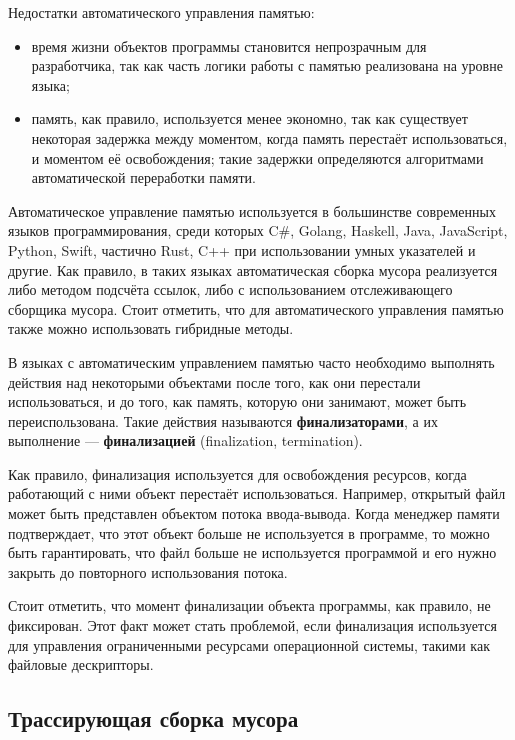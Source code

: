 Недостатки автоматического управления памятью: 

\begin{itemize}[label*=---]
	\item время жизни объектов программы становится непрозрачным для разработчика, так как часть логики работы с памятью реализована на уровне языка;
	\item память, как правило, используется менее экономно, так как существует некоторая задержка между моментом, когда память перестаёт использоваться, и моментом её освобождения; такие задержки определяются алгоритмами автоматической переработки памяти.
\end{itemize}

Автоматическое управление памятью используется в большинстве современных языков программирования, среди которых C\#, Golang, Haskell, Java, JavaScript, Python, Swift, частично Rust, C++ при использовании умных указателей и другие. Как правило, в таких языках автоматическая сборка мусора реализуется либо методом подсчёта ссылок, либо с использованием отслеживающего сборщика мусора. \cite{recycling} Стоит отметить, что для автоматического управления памятью также можно использовать гибридные методы. \cite{cornell2} \cite{urc}

В языках с автоматическим управлением памятью часто необходимо выполнять действия над некоторыми объектами после того, как они перестали использоваться, и до того, как память, которую они занимают, может быть переиспользована. Такие действия называются \textbf{финализаторами}, а их выполнение --- \textbf{финализацией} (finalization, termination). \cite{glossary}

Как правило, финализация используется для освобождения ресурсов, когда работающий с ними объект перестаёт использоваться. Например, открытый файл может быть представлен объектом потока ввода-вывода. Когда менеджер памяти подтверждает, что этот объект больше не используется в программе, то можно быть гарантировать, что файл больше не используется программой и его нужно закрыть до повторного использования потока. \cite{glossary}

Стоит отметить, что момент финализации объекта программы, как правило, не фиксирован. Этот факт может стать проблемой, если финализация используется для управления ограниченными ресурсами операционной системы, такими как файловые дескрипторы. \cite{glossary}



\subsection{Трассирующая сборка мусора}
\label{roots}


